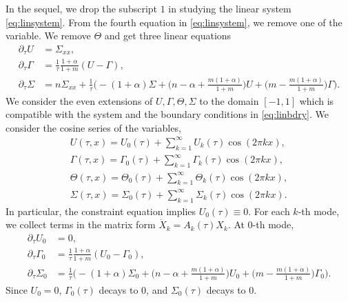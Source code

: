 \documentclass[a4paper,11pt]{article}
\theoremstyle{remark}
\begin{document}
In the sequel, we drop the subscript $1$ in studying the linear system \eqref{eq:linsystem}. From the fourth equation in \eqref{eq:linsystem}, we remove one of the variable. We remove $\Theta$ and get three linear equations
\begin{equation}
 \begin{aligned}
  \partial_\tau U &= \Sigma_{xx},\\
  \partial_\tau\Gamma &= \frac{1}{\tau}\frac{1+\alpha}{1+m}(U-\Gamma),\\
  \partial_\tau\Sigma
  &= n\Sigma_{xx} +\frac{1}{\tau}\Big( -(1+\alpha)\Sigma + \big(n-\alpha + \frac{m(1+\alpha)}{1+m}\big)U + \big(m - \frac{m(1+\alpha)}{1+m}\big)\Gamma\Big).
 \end{aligned}
\end{equation}
We consider the even extensions of $U,\Gamma,\Theta,\Sigma$ to the domain $[-1,1]$ which is compatible with the system and the boundary conditions in \eqref{eq:linbdry}. We consider the cosine series of the variables,
\begin{align*}
 U(\tau,x) = U_0(\tau) + \sum_{k=1}^\infty U_k(\tau)\cos(2\pi kx),\\
 \Gamma(\tau,x) = \Gamma_0(\tau) + \sum_{k=1}^\infty \Gamma_k(\tau)\cos(2\pi kx),\\
 \Theta(\tau,x) = \Theta_0(\tau) + \sum_{k=1}^\infty \Theta_k(\tau)\cos(2\pi kx),\\
 \Sigma(\tau,x) = \Sigma_0(\tau) + \sum_{k=1}^\infty \Sigma_k(\tau)\cos(2\pi kx).
\end{align*}
In particular, the constraint equation implies $U_0(\tau)\equiv0$. For each $k$-th mode, we collect terms in the matrix form $\dot{X}_k = A_k(\tau)X_k$. At $0$-th mode,
\begin{align*}
   \partial_\tau U_0 &= 0,\\
  \partial_\tau\Gamma_0 &= \frac{1}{\tau}\frac{1+\alpha}{1+m}(U_0-\Gamma_0),\\
  \partial_\tau\Sigma_0 &= \frac{1}{\tau}\Big( -(1+\alpha)\Sigma_0 + \big(n-\alpha + \frac{m(1+\alpha)}{1+m}\big)U_0 + \big(m - \frac{m(1+\alpha)}{1+m}\big)\Gamma_0\Big).
\end{align*}
Since $U_0=0$, $\Gamma_0(\tau)$ decays to $0$, and $\Sigma_0(\tau)$ decays to $0$.
\end{document}
